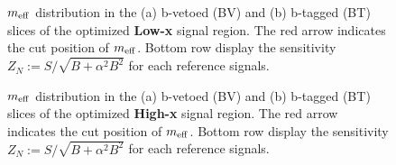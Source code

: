 \clearpage
\begin{figure}[h]
  \centering
    \caption{ 
     $m_{\mathrm{eff}}$ distribution in the (a) b-vetoed (BV) and (b) b-tagged (BT) slices of the optimized \textbf{Low-x} signal region. The red arrow indicates the cut position of $m_{\mathrm{eff}}$. Bottom row display the sensitivity $Z_N := S/\sqrt{B+\alpha^2 B^2}$ for each reference signals.
    \label{fig::SRdefinition::SRmeffIncLowx}}
\end{figure}

\begin{figure}[h]
  \centering
    \caption{ 
     $m_{\mathrm{eff}}$ distribution in the (a) b-vetoed (BV) and (b) b-tagged (BT) slices of the optimized \textbf{High-x} signal region. The red arrow indicates the cut position of $m_{\mathrm{eff}}$. Bottom row display the sensitivity $Z_N := S/\sqrt{B+\alpha^2 B^2}$ for each reference signals.
    \label{fig::SRdefinition::SRmeffIncHighx}       }
\end{figure}

